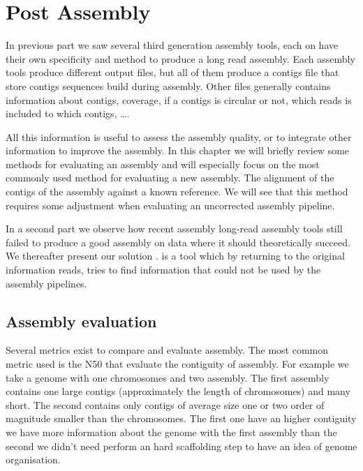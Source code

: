 \documentclass[main.tex]{subfiles}
\begin{document}
\chapter{Post Assembly} \label{chapter:postassembly}

In previous part we saw several third generation assembly tools, each on have their own specificity and method to produce a long read assembly. Each assembly tools produce different output files, but all of them produce a contigs file that store contigs sequences build during assembly. Other files generally contains information about contigs, coverage, if a contigs is circular or not, which reads is included to which contigs, ….

All this information is useful to assess the assembly quality, or to integrate other information to improve the assembly. In this chapter we will briefly review some methods for evaluating an assembly and will especially focus on the most commonly used method for evaluating a new assembly. 
The alignment of the contigs of the assembly against a known reference.%
We will see that this method requires some adjustment when evaluating an uncorrected assembly pipeline.

In a second part we  observe how recent assembly long-read assembly tools still failed to produce a good assembly on data where  it should  theoretically succeed. We thereafter present our solution \knot. \knot is a tool which by returning to the original information reads, tries to find information that could not be used by the assembly pipelines.%


\section{Assembly evaluation} \label{section:post:eval}

Several metrics exist to compare and evaluate assembly. The most common metric used is the N50 that evaluate the contiguity of assembly. For example we take a genome with one chromosomes and two assembly. The first assembly contains one large contigs (approximately the length of chromosomes) and many short. The second contains only contigs of average size one or two order of magnitude smaller than the chromosomes. The first one have an higher contiguity we have more information about the genome with the first assembly than the second we didn't need perform an hard scaffolding step to have an idea of genome organisation.
\end{document}
